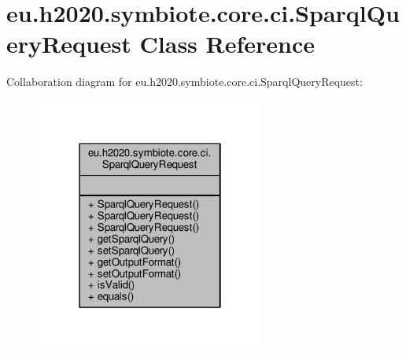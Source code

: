 \hypertarget{classeu_1_1h2020_1_1symbiote_1_1core_1_1ci_1_1SparqlQueryRequest}{}\section{eu.\+h2020.\+symbiote.\+core.\+ci.\+Sparql\+Query\+Request Class Reference}
\label{classeu_1_1h2020_1_1symbiote_1_1core_1_1ci_1_1SparqlQueryRequest}


Collaboration diagram for eu.\+h2020.\+symbiote.\+core.\+ci.\+Sparql\+Query\+Request\+:
\nopagebreak
\begin{figure}[H]
\begin{center}
\leavevmode
\includegraphics[width=214pt]{classeu_1_1h2020_1_1symbiote_1_1core_1_1ci_1_1SparqlQueryRequest__coll__graph}
\end{center}
\end{figure}
